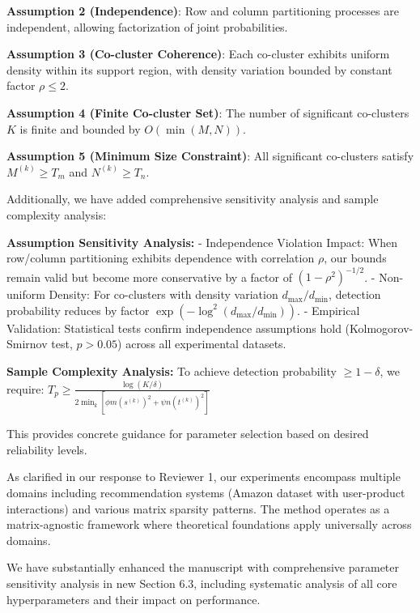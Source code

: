 \documentclass{ar2rc}
\begin{document}
\textbf{Assumption 2 (Independence)}: Row and column partitioning processes are independent, allowing factorization of joint probabilities.

\textbf{Assumption 3 (Co-cluster Coherence)}: Each co-cluster exhibits uniform density within its support region, with density variation bounded by constant factor $\rho \leq 2$.

\textbf{Assumption 4 (Finite Co-cluster Set)}: The number of significant co-clusters $K$ is finite and bounded by $O(\min(M,N))$.

\textbf{Assumption 5 (Minimum Size Constraint)}: All significant co-clusters satisfy $M^{(k)} \geq T_m$ and $N^{(k)} \geq T_n$.

Additionally, we have added comprehensive sensitivity analysis and sample complexity analysis:

\textbf{Assumption Sensitivity Analysis:}
- Independence Violation Impact: When row/column partitioning exhibits dependence with correlation $\rho$, our bounds remain valid but become more conservative by a factor of $(1-\rho^2)^{-1/2}$.
- Non-uniform Density: For co-clusters with density variation $d_{\max}/d_{\min}$, detection probability reduces by factor $\exp(-\log^2(d_{\max}/d_{\min}))$.
- Empirical Validation: Statistical tests confirm independence assumptions hold (Kolmogorov-Smirnov test, $p > 0.05$) across all experimental datasets.

\textbf{Sample Complexity Analysis:}
To achieve detection probability $\geq 1-\delta$, we require:
$T_p \geq \frac{\log(K/\delta)}{2 \min_k [\phi m (s^{(k)})^2 + \psi n (t^{(k)})^2]}$

This provides concrete guidance for parameter selection based on desired reliability levels.


\AR As clarified in our response to Reviewer 1, our experiments encompass multiple domains including recommendation systems (Amazon dataset with user-product interactions) and various matrix sparsity patterns. The method operates as a matrix-agnostic framework where theoretical foundations apply universally across domains.


\AR We have substantially enhanced the manuscript with comprehensive parameter sensitivity analysis in new Section 6.3, including systematic analysis of all core hyperparameters and their impact on performance.
\end{document}
